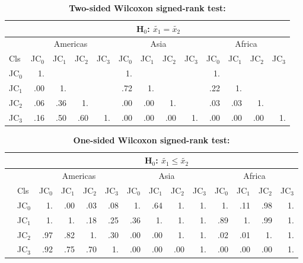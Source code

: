 		\begin{table}[ht]
			\centering
			\caption[Two-sided Wilcoxon signed-rank test]{\textbf{Two-sided Wilcoxon signed-rank test:}}
			\label{tab:wilcoxontwosided}
			\begin{tabular}{lrrrrrrrrrrrr}
				\hline
				& \multicolumn{12}{c}{H$_0$: $\tilde{x_1}=\tilde{x_2}$} \\\hline
				& \multicolumn{4}{c}{Americas} & \multicolumn{4}{c}{Asia} & \multicolumn{4}{c}{Africa} \\
				Cls & JC$_0$ & JC$_1$ & JC$_2$ & JC$_3$ & JC$_0$ & JC$_1$ & JC$_2$ & JC$_3$ & JC$_0$ & JC$_1$ & JC$_2$ & JC$_3$ \\\hline
				JC$_0$ & 1. &  &  &  & 1. &  &  &  & 1. &  &  & \\
				JC$_1$ & .00 & 1. &  &  & .72 & 1. &  &  & .22 & 1. &  & \\
				JC$_2$ & .06 & .36 & 1. &  & .00 & .00 & 1. &  & .03 & .03 & 1. & \\
				JC$_3$ & .16 & .50 & .60 & 1. & .00 & .00 & .00 & 1. & .00 & .00 & .00 & 1. \\\hline
			\end{tabular}
		\end{table}

		\begin{table}[ht]
			\centering
			\caption[One-sided Wilcoxon signed-rank test]{\textbf{One-sided Wilcoxon signed-rank test:}}
			\label{tab:wilcoxononesided}
			\begin{tabular}{llrrrrrrrrrrrr}
				\hline
				& & \multicolumn{12}{c}{H$_0$: $\tilde{x_1}\leq\tilde{x_2}$} \\\hline
				& & \multicolumn{4}{c}{Americas} & \multicolumn{4}{c}{Asia} & \multicolumn{4}{c}{Africa} \\
				& Cls & JC$_0$ & JC$_1$ & JC$_2$ & JC$_3$ & JC$_0$ & JC$_1$ & JC$_2$ & JC$_3$ & JC$_0$ & JC$_1$ & JC$_2$ & JC$_3$ \\\hline
				\multirow{4}{*}{\STAB{\rotatebox[origin=c]{90}{H$_0$: $\tilde{x_1}\geq\tilde{x_2}$}}} & JC$_0$ & 1. & .00 & .03 & .08 & 1. & .64 & 1. & 1. & 1. & .11 & .98 & 1. \\
				& JC$_1$ & 1. & 1. & .18 & .25 & .36 & 1. & 1. & 1. & .89 & 1. & .99 & 1. \\
				& JC$_2$ & .97 & .82 & 1. & .30 & .00 & .00 & 1. & 1. & .02 & .01 & 1. & 1. \\
				& JC$_3$ & .92 & .75 & .70 & 1. & .00 & .00 & .00 & 1. & .00 & .00 & .00 & 1. \\\hline
			\end{tabular}
		\end{table}

